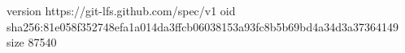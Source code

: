 version https://git-lfs.github.com/spec/v1
oid sha256:81e058f352748efa1a014da3ffcb06038153a93fc8b5b69bd4a34d3a37364149
size 87540
